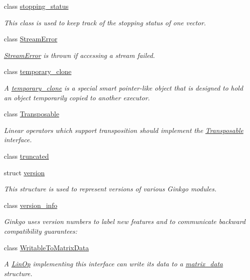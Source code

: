 \begin{DoxyCompactItemize}
class \hyperlink{classgko_1_1stopping__status}{stopping\+\_\+status}
\begin{DoxyCompactList}\small\item\em This class is used to keep track of the stopping status of one vector. \end{DoxyCompactList}\item 
class \hyperlink{classgko_1_1StreamError}{Stream\+Error}
\begin{DoxyCompactList}\small\item\em \hyperlink{classgko_1_1StreamError}{Stream\+Error} is thrown if accessing a stream failed. \end{DoxyCompactList}\item 
class \hyperlink{classgko_1_1temporary__clone}{temporary\+\_\+clone}
\begin{DoxyCompactList}\small\item\em A \hyperlink{classgko_1_1temporary__clone}{temporary\+\_\+clone} is a special smart pointer-\/like object that is designed to hold an object temporarily copied to another executor. \end{DoxyCompactList}\item 
class \hyperlink{classgko_1_1Transposable}{Transposable}
\begin{DoxyCompactList}\small\item\em Linear operators which support transposition should implement the \hyperlink{classgko_1_1Transposable}{Transposable} interface. \end{DoxyCompactList}\item 
class \hyperlink{classgko_1_1truncated}{truncated}
\item 
struct \hyperlink{structgko_1_1version}{version}
\begin{DoxyCompactList}\small\item\em This structure is used to represent versions of various Ginkgo modules. \end{DoxyCompactList}\item 
class \hyperlink{classgko_1_1version__info}{version\+\_\+info}
\begin{DoxyCompactList}\small\item\em Ginkgo uses version numbers to label new features and to communicate backward compatibility guarantees\+: \end{DoxyCompactList}\item 
class \hyperlink{classgko_1_1WritableToMatrixData}{Writable\+To\+Matrix\+Data}
\begin{DoxyCompactList}\small\item\em A \hyperlink{classgko_1_1LinOp}{Lin\+Op} implementing this interface can write its data to a \hyperlink{structgko_1_1matrix__data}{matrix\+\_\+data} structure. \end{DoxyCompactList}\end{DoxyCompactItemize}

